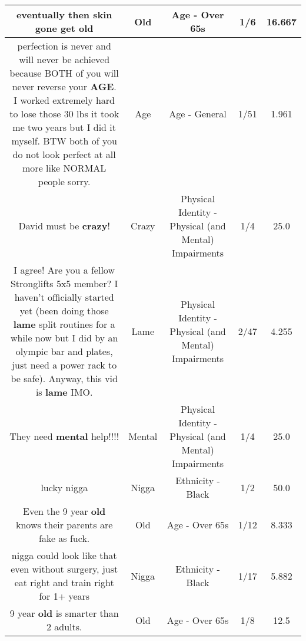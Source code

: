 \documentclass[11pt]{article}
\newlength\mylength
\begin{document}
\begin{center}
\begin{longtable}{|C{.65\mylength}|C{.30\mylength}|C{.12\mylength}|C{.12\mylength}|C{.12\mylength}|}
  \small eventually then skin gone get old\normalsize   & Old & Age - Over 65s & 1/6 & 16.667 \\  \hline
  \small perfection is never and will never be achieved because BOTH of you will never reverse your \textbf{AGE}.  I worked extremely hard to lose those 30 lbs it took me two years but I did it myself.  BTW both of you do not look perfect at all more like NORMAL people sorry.\normalsize   & Age & Age - General & 1/51 & 1.961 \\  \hline
  \small David must be \textbf{crazy}!\normalsize   & Crazy & Physical Identity - Physical (and Mental) Impairments & 1/4 & 25.0 \\  \hline
  \small I agree! Are you a fellow Stronglifts 5x5 member? I haven't officially started yet (been doing those \textbf{lame} split routines for a while now but I did by an olympic bar and plates, just need a power rack to be safe). Anyway, this vid is \textbf{lame} IMO.\normalsize   & Lame & Physical Identity - Physical (and Mental) Impairments & 2/47 & 4.255 \\  \hline
  \small They need \textbf{mental} help!!!!\normalsize   & Mental & Physical Identity - Physical (and Mental) Impairments & 1/4 & 25.0 \\  \hline
  \small lucky nigga\normalsize   & Nigga & Ethnicity - Black & 1/2 & 50.0 \\  \hline
  \small Even the 9 year \textbf{old} knows their parents are fake as fuck.\normalsize   & Old & Age - Over 65s & 1/12 & 8.333 \\  \hline
  \small nigga could look like that even without surgery, just eat right and train right for 1+ years\normalsize   & Nigga & Ethnicity - Black & 1/17 & 5.882 \\  \hline
  \small 9 year \textbf{old} is smarter than 2 adults.\normalsize   & Old & Age - Over 65s & 1/8 & 12.5 \\  \hline

\end{longtable}
\end{center}
\end{document}
